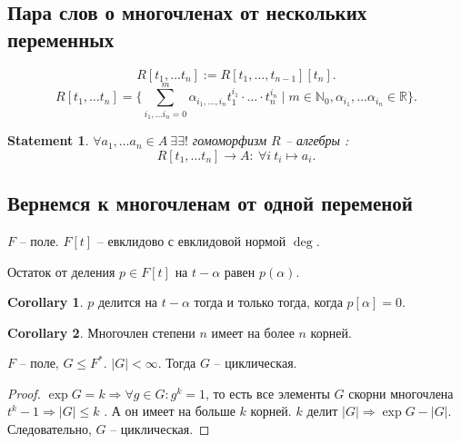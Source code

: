 \documentclass[11pt]{book}
\newcommand{\N}{\mathbb{N}}
\newcommand{\R}{\mathbb{R}}
\theoremstyle{definition}
\theoremstyle{plain}
\theoremstyle{plain}
\newtheorem*{st}{Statement}
\theoremstyle{definition}
\newtheorem*{cor}{Corollary}
\theoremstyle{remark}
\begin{document}
 \subsection{Пара слов о многочленах от нескольких переменных}
 \[
     R[t_1, \ldots t_n] := R[t_1, \ldots , t_{n-1}] [t_n]
 .\] 
 \[
     R[t_1, \ldots t_n] = \{ \sum_{i_1, \ldots i_n = 0}^{m} \alpha _{i_1, \ldots , i_n} t_1^{i_1} \cdot  \ldots  \cdot  t_n ^{i_n} \mid m \in  \N_0, \alpha _{ i_1 } , \ldots \alpha _{ i_n}  \in { \R}\}
 .\] 
 \begin{st}
     $
     \forall a_1, \ldots a_n \in  A ~ \exists  
     \exists !$ гомоморфизм $ R$ -- алгебры  :
     \[
	 R[t_1, \ldots t_n] \to  A: ~ \forall i ~ t_i \mapsto a_i
     .\] 
 \end{st}
 \subsection{Вернемся к многочленам от одной переменой}
 $ F$ -- поле. $ F[t]$ -- евклидово с евклидовой нормой $ \deg$.
 \begin{thm}[Безу]
     Остаток от деления $ p \in  F[t]$ на $ t - \alpha $ равен $ p(\alpha)$.
 \end{thm}
 \begin{cor}
     $ p$ делится на $ t- \alpha $ тогда и только тогда, когда $ p[ \alpha ] = 0$.
 \end{cor}
 \begin{cor}
     Многочлен степени $ n$ имеет на более $ n$ корней.
 \end{cor}
  \begin{thm}
     $ F$ -- поле, $ G \le F^{*}$.
     $ |G|< \infty $. Тогда $ G$ -- циклическая.
 \end{thm}
 \begin{proof}
     $ \exp G = k \Longrightarrow \forall g \in  G: g^{k } = 1$, то есть все элементы $ G$ скорни многочлена $ t ^{k} -1 \Longrightarrow  |G| \le k$ . А он имеет на больше  $ k$ корней. 
     $ k$ делит  $ |G| \Longrightarrow  \exp G - |G|$. Следовательно, $ G$ -- циклическая. 
 \end{proof}
\end{document}
